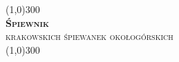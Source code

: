 \documentclass[8pt,twocolumn]{extbook}
\begin{document}
    \begin{titlepage}
        \begin{center}
        \line(1,0){300}\\
        [0.5cm]
        \textsc{\huge{\bfseries Śpiewnik}}\\
        \textsc{\large krakowskich śpiewanek okołogórskich}\\
        [0.3cm]
        \line(1,0){300}\\
        \end{center}
        \clearpage
    \end{titlepage}
    \onecolumn
    \begin{multicols*}{2}
    \tableofcontents
    \end{multicols*}
    \twocolumn
    \thispagestyle{empty}
    \cleardoublepage
    
    
    
    
    
    
\end{document}

